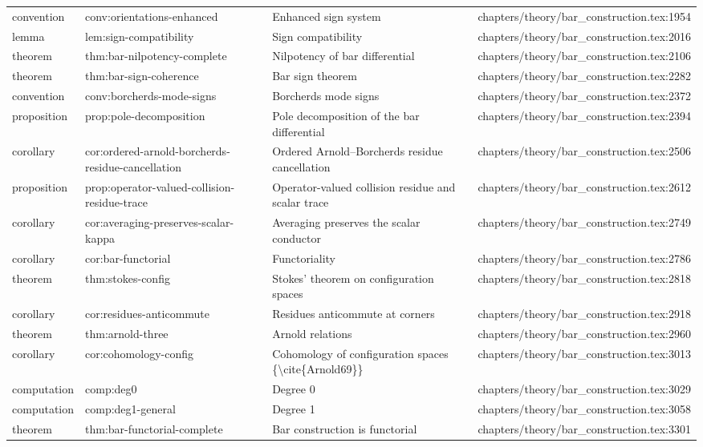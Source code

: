 \documentclass[11pt]{article}
\begin{document}
\begin{longtable}{L{0.10\textwidth}L{0.26\textwidth}L{0.42\textwidth}L{0.22\textwidth}}
convention & conv:orientations-enhanced & Enhanced sign system & chapters/theory/bar\_construction.tex:1954\\
lemma & lem:sign-compatibility & Sign compatibility & chapters/theory/bar\_construction.tex:2016\\
theorem & thm:bar-nilpotency-complete & Nilpotency of bar differential & chapters/theory/bar\_construction.tex:2106\\
theorem & thm:bar-sign-coherence & Bar sign theorem & chapters/theory/bar\_construction.tex:2282\\
convention & conv:borcherds-mode-signs & Borcherds mode signs & chapters/theory/bar\_construction.tex:2372\\
proposition & prop:pole-decomposition & Pole decomposition of the bar differential & chapters/theory/bar\_construction.tex:2394\\
corollary & cor:ordered-arnold-borcherds-residue-cancellation & Ordered Arnold--Borcherds residue cancellation & chapters/theory/bar\_construction.tex:2506\\
proposition & prop:operator-valued-collision-residue-trace & Operator-valued collision residue and scalar trace & chapters/theory/bar\_construction.tex:2612\\
corollary & cor:averaging-preserves-scalar-kappa & Averaging preserves the scalar conductor & chapters/theory/bar\_construction.tex:2749\\
corollary & cor:bar-functorial & Functoriality & chapters/theory/bar\_construction.tex:2786\\
theorem & thm:stokes-config & Stokes' theorem on configuration spaces & chapters/theory/bar\_construction.tex:2818\\
corollary & cor:residues-anticommute & Residues anticommute at corners & chapters/theory/bar\_construction.tex:2918\\
theorem & thm:arnold-three & Arnold relations & chapters/theory/bar\_construction.tex:2960\\
corollary & cor:cohomology-config & Cohomology of configuration spaces \{\textbackslash{}cite\{Arnold69\}\} & chapters/theory/bar\_construction.tex:3013\\
computation & comp:deg0 & Degree 0 & chapters/theory/bar\_construction.tex:3029\\
computation & comp:deg1-general & Degree 1 & chapters/theory/bar\_construction.tex:3058\\
theorem & thm:bar-functorial-complete & Bar construction is functorial & chapters/theory/bar\_construction.tex:3301\\

\end{longtable}
\end{document}
